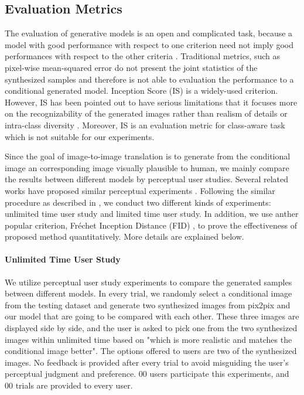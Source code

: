 %
%
\subsection{ Evaluation Metrics}
The evaluation of generative models is an open and complicated task, because a model with good performance with respect to one criterion need not imply good performances with respect to the other criteria \cite{evaluation, GANs_equal}. Traditional metrics, such as pixel-wise mean-squared error do not present the joint statistics of the synthesized samples and therefore is not able to evaluation the performance to a conditional generated model. 
Inception Score (IS) \cite{IS} is a widely-used criterion. However, IS has been pointed out to have serious limitations that it focuses more on the recognizability of the generated images rather than realism of details or intra-class diversity \cite{evaluation}. Moreover, IS is an evaluation metric for class-aware task which is not suitable for our experiments.
 
Since the goal of image-to-image translation is to generate from the conditional image an corresponding image visually plausible to human, we mainly compare the results between different models by perceptual user studies. Several related works have proposed similar perceptual experiments \cite{LaplaceGANs, SRGANs, Improved_techniques, CRN, pix2pixHD}. Following the similar procedure as described in \cite{CRN}, we conduct two different kinds of experiments: unlimited time user study and limited time user study. 
In addition, we use anther popular criterion, Fr\'echet Inception Distance (FID) \cite{FID}, to prove the effectiveness of proposed method quantitatively. More details are explained below.
\paragraph{Unlimited Time User Study}
We utilize perceptual user study experiments to compare the generated samples between different models. In every trial, we randomly select a conditional image from the testing dataset and generate two synthesized images from pix2pix and our model that are going to be compared with each other. These three images are displayed side by side, and the user is asked to pick one from the two synthesized images within unlimited time based on "which is more realistic and matches the conditional image better". The options offered to users are two of the synthesized images. No feedback is provided after every trial to avoid misguiding the user's perceptual judgment and preference. 00 users participate this experiments, and 00 trials are provided to every user. 
